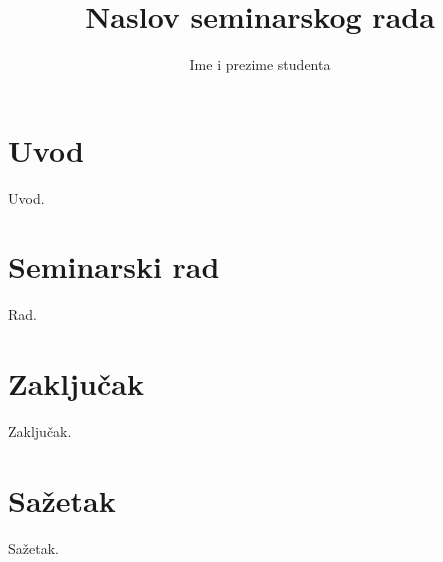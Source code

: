 \documentclass[times, utf8, seminar, numeric]{fer}
\begin{document}
\nocite{*}

\title{Naslov seminarskog rada}

\author{Ime i prezime studenta}


\maketitle

\tableofcontents

\chapter{Uvod}
Uvod.

\chapter{Seminarski rad}
Rad.

\chapter{Zaključak}
Zaključak.




\chapter{Sažetak}
Sažetak.
\end{document}
